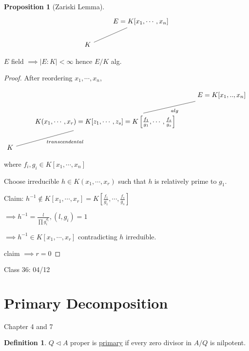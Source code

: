 \documentclass{article}
\theoremstyle{definition}
\newtheorem{definition}{Definition}
\newtheorem{proposition}{Proposition}
\begin{document}
\begin{proposition}
    [Zariski Lemma]

    \[
        \begin{tikzcd}
            & E = K[x_1,\cdots,x_n] \ar[ld, no head]\\
            K
        \end{tikzcd}
    \]

    \(E\) field \(\implies \vert E : K \vert < \infty\) hence \(E / K\) alg. 
\end{proposition}

\begin{proof}
    After reordering \(x_1,\cdots,x_n\),

    \[
        \begin{tikzcd}
            & & E=K[x_1,..,x_n] \ar[ld, no head, "alg"] \\
            & K(x_1,\cdots,x_r) = K[z_1,\cdots,z_s] = K \left[ \frac{f_1}{g_1},\cdots,\frac{f_s}{g_s} \right]\ar[ld, "transcendental", no head] \\
            K
        \end{tikzcd}
    \] 

    where \(f_i, g_i\in K[x_1,\cdots,x_n]\) 

    Choose irreducible \(h\in K(x_1,\cdots,x_r)\) such that \(h\) is relatively prime to \(g_1\).

    Claim: \(h ^{-1} \notin K[x_1,\cdots,x_r]=K\left[ \frac{f_1}{g_1},\cdots,\frac{f_s}{g_s} \right] \)
    
    \(\implies h^{-1} = \frac{l}{\prod g_i ^{d_i}}, (l,g_i)=1\)
    
    \(\implies h ^{-1} \in K[x_1,\cdots,x_r]\) contradicting \(h\) irreduible.
    
    claim \(\implies r = 0\) 
\end{proof}



\hrulefill

Class 36: 04/12

\section*{Primary Decomposition}

Chapter 4 and 7

\begin{definition}
    \(Q \triangleleft A\) proper is \underline{primary}  if every zero divisor in \(A / Q\) is nilpotent. 
\end{definition}
\end{document}
